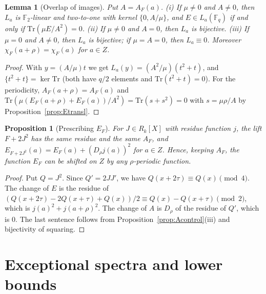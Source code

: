 \documentclass[11pt]{article}
\newtheorem{lemma}[theorem]{Lemma}
\newtheorem{proposition}[theorem]{Proposition}
\theoremstyle{definition}
\theoremstyle{remark}
\newcommand{\F}{\mathbb{F}}
\newcommand{\Tr}{\mathrm{Tr}}
\begin{document}
\begin{lemma}[Overlap of images]\label{lem:overlap}
Put $A=A_F(a)$. (i) If $\mu\ne0$ and $A\ne0$, then $L_a$ is $\F_2$-linear and two-to-one with kernel
$\{0,A/\mu\}$, and $E\in L_a(\F_q)$ if and only if $\Tr(\mu E/A^2)=0$. (ii) If $\mu\ne0$ and $A=0$, then $L_a$
is bijective. (iii) If $\mu=0$ and $A\ne0$, then $L_a$ is bijective; if $\mu=A=0$, then $L_a\equiv0$. Moreover $\chi_F(a+\rho)=\chi_F(a)$ for $a\in Z$.
\end{lemma}
\begin{proof}
With $y=(A/\mu)t$ we get $L_a(y)=(A^2/\mu)(t^2+t)$, and $\{t^2+t\}=\ker\Tr$ (both have $q/2$ elements and
$\Tr(t^2+t)=0$). For the periodicity, $A_F(a+\rho)=A_F(a)$ and
$\Tr(\mu(E_F(a+\rho)+E_F(a))/A^2)=\Tr(s+s^2)=0$ with $s=\mu\rho/A$ by Proposition~\ref{prop:Etransl}.
\end{proof}

\begin{proposition}[Prescribing $E_F$]\label{prop:Econtrol}
For $J\in R_k[X]$ with residue function $j$, the lift $F+2J^2$ has the same residue and the same $A_F$, and
$E_{F+2J^2}(a)=E_F(a)+(D_\rho j(a))^2$ for $a\in Z$. Hence, keeping $A_F$, the function $E_F$ can be shifted on
$Z$ by any $\rho$-periodic function.
\end{proposition}
\begin{proof}
Put $Q=J^2$. Since $Q'=2JJ'$, we have $Q(x+2\tau)\equiv Q(x)\pmod4$. The change of $E$ is the residue of
$(Q(x+2\tau)-2Q(x+\tau)+Q(x))/2\equiv Q(x)-Q(x+\tau)\pmod2$, which is $j(a)^2+j(a+\rho)^2$. The change of $A$ is
$D_\rho$ of the residue of $Q'$, which is $0$. The last sentence follows from
Proposition~\ref{prop:Acontrol}(iii) and bijectivity of squaring.
\end{proof}

\section{Exceptional spectra and lower bounds}\label{sec:spectra}
\end{document}
